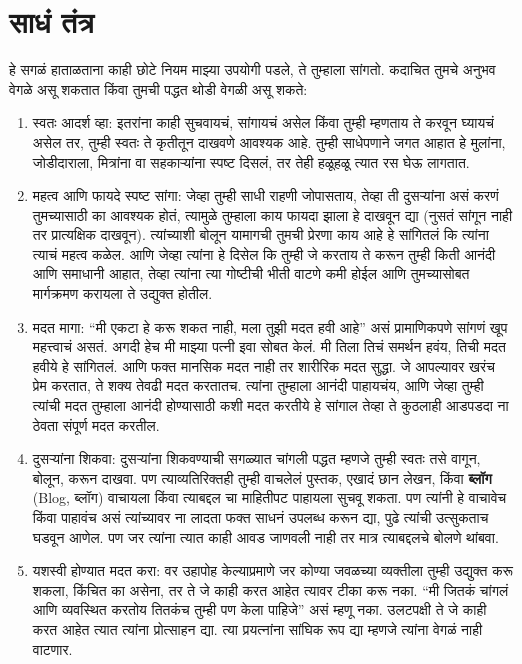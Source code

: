 \section*{साधं तंत्र}
हे सगळं हाताळताना काही छोटे नियम माझ्या उपयोगी पडले, ते तुम्हाला सांगतो. कदाचित तुमचे अनुभव वेगळे असू शकतात किंवा तुमची पद्धत थोडी वेगळी असू शकते:
\begin{enumerate}
 \item स्वतः आदर्श व्हा: इतरांना काही सुचवायचं, सांगायचं असेल किंवा तुम्ही म्हणताय ते करवून घ्यायचं असेल तर, तुम्ही स्वतः ते कृतीतून दाखवणे आवश्यक आहे. तुम्ही साधेपणाने जगत आहात हे मुलांना, जोडीदाराला, मित्रांना वा सहकाऱ्यांना स्पष्ट दिसलं, तर तेही हळूहळू त्यात रस घेऊ लागतात.
 \item  महत्व आणि फायदे स्पष्ट सांगा: जेव्हा तुम्ही साधी राहणी जोपासताय, तेव्हा ती दुसऱ्यांना असं करणं तुमच्यासाठी का आवश्यक होतं, त्यामुळे तुम्हाला काय फायदा झाला हे दाखवून द्या (नुसतं सांगून नाही तर प्रात्यक्षिक दाखवून). त्यांच्याशी बोलून यामागची तुमची प्रेरणा काय आहे हे सांगितलं कि त्यांना त्याचं महत्व कळेल. आणि जेव्हा त्यांना हे दिसेल कि तुम्ही जे करताय ते करून तुम्ही किती आनंदी आणि समाधानी आहात, तेव्हा त्यांना त्या गोष्टीची भीती वाटणे कमी होईल आणि तुमच्यासोबत मार्गक्रमण करायला ते उद्युक्त होतील.
 \item मदत मागा: “मी एकटा हे करू शकत नाही, मला तुझी मदत हवी आहे” असं प्रामाणिकपणे सांगणं खूप महत्त्वाचं असतं. अगदी हेच मी माझ्या पत्नी इवा सोबत केलं. मी तिला तिचं समर्थन हवंय, तिची मदत हवीये हे सांगितलं. आणि फक्त मानसिक मदत नाही तर शारीरिक मदत सुद्धा. जे आपल्यावर खरंच प्रेम करतात, ते शक्य तेवढी मदत करतातच. त्यांना तुम्हाला आनंदी पाहायचंय, आणि जेव्हा तुम्ही त्यांची मदत तुम्हाला आनंदी होण्यासाठी कशी मदत करतीये हे सांगाल तेव्हा ते कुठलाही आडपडदा ना ठेवता संपूर्ण मदत करतील.
 \item  दुसऱ्यांना शिकवा: दुसऱ्यांना शिकवण्याची सगळ्यात चांगली पद्धत म्हणजे तुम्ही स्वतः तसे वागून, बोलून, करून दाखवा. पण त्याव्यतिरिक्तही तुम्ही वाचलेलं पुस्तक, एखादं छान लेखन, किंवा \textbf{ब्लॉग} (Blog,  ब्लॉग) वाचायला किंवा त्याबद्दल चा माहितीपट पाहायला सुचवू शकता. पण त्यांनी हे वाचावेच किंवा पाहावंच असं त्यांच्यावर ना लादता फक्त साधनं उपलब्ध करून द्या, पुढे त्यांची उत्सुकताच घडवून आणेल. पण जर त्यांना त्यात काही आवड जाणवली नाही तर मात्र त्याबद्दलचे बोलणे थांबवा.
 \item  यशस्वी होण्यात मदत करा: वर उहापोह केल्याप्रमाणे जर कोण्या जवळच्या व्यक्तीला तुम्ही उद्युक्त करू शकला, किंचित का असेना, तर ते जे काही करत आहेत त्यावर टीका करू नका. “मी जितकं चांगलं आणि व्यवस्थित करतोय तितकंच तुम्ही पण केला पाहिजे” असं म्हणू नका. उलटपक्षी ते जे काही करत आहेत त्यात त्यांना प्रोत्साहन द्या. त्या प्रयत्नांना सांघिक रूप द्या म्हणजे त्यांना वेगळं नाही वाटणार. 

\end{enumerate}

